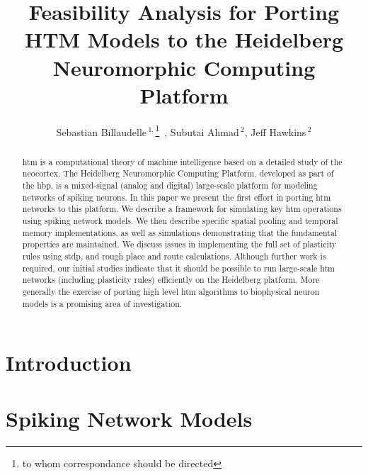 \documentclass{reporter}
\begin{document}

\title[Porting HTM Models to a Neuromorphic Platform]{Feasibility Analysis for Porting HTM Models to the Heidelberg Neuromorphic Computing Platform}
\author[Billaudelle]{Sebastian Billaudelle\,$^{1,}$\footnote{to whom correspondance should be directed}\ , Subutai Ahmad\,$^{2}$, Jeff Hawkins\,$^{2}$}
\address{$^{1}$Kirchhoff-Institute for Physics, Heidelberg, Germany\\
$^{2}$Numenta, Inc., Redwood City, CA}



\maketitle

\begin{abstract}

\gls{htm} is a computational theory of machine
intelligence based on a detailed study of the neocortex. The Heidelberg
Neuromorphic Computing Platform, developed as part of the \gls{hbp},
is a mixed-signal (analog and digital) large-scale platform for
modeling networks of spiking neurons. In this paper we present the first effort
in porting \gls{htm} networks to this platform.  We describe a framework for
simulating key \gls{htm} operations  using spiking network models. We then describe
specific spatial pooling and temporal memory implementations, as well as
simulations demonstrating that the fundamental properties are maintained. We
discuss issues in implementing the full set of plasticity rules using \gls{stdp}, and
rough place and route calculations. Although further work is required, our
initial studies indicate that it should be  possible to run large-scale \gls{htm}
networks (including plasticity rules) efficiently on the Heidelberg platform.
More generally the exercise of porting high level \gls{htm} algorithms to biophysical
neuron models is a promising area of investigation.

\end{abstract}

\glsresetall

\section{Introduction}


\section{Spiking Network Models}

\end{document}
